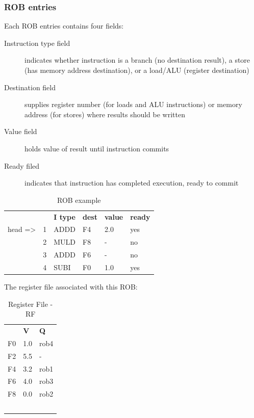 \subsubsection{ROB entries}
Each ROB entries contains four fields:
\begin{description}
    \item[Instruction type field] indicates whether instruction
    is a branch (no destination result), a store (has
    memory address destination), or a load/ALU
    (register destination)
    \item[Destination field] supplies register number (for
    loads and ALU instructions) or memory address (for
    stores) where results should be written
    \item[Value field] holds value of result until
    instruction commits
    \item[Ready filed] indicates that instruction has
    completed execution, ready to commit
\end{description}

\begin{table}[H]
    \centering
    \begin{tabular}{llllll}
        & & \textbf{I type} & \textbf{dest} & \textbf{value} & \textbf{ready}  \\
        head => & 1 & ADDD & F4 & 2.0 & yes \\
        & 2 & MULD & F8 & - & no \\
        & 3 & ADDD & F6 & - & no \\
        & 4 & SUBI & F0 & 1.0 & yes \\
    \end{tabular}
    \caption{ROB example}
    \label{tab:rob-example}
\end{table}

The register file associated with this ROB:
\begin{table}[H]
    \centering
    \begin{tabular}{l|ll}
        \textbf{} & \textbf{V} & \textbf{Q} \\
        F0 & 1.0 & rob4 \\
        F2 & 5.5 & - \\
        F4 & 3.2 & rob1 \\
        F6 & 4.0 & rob3 \\
        F8 & 0.0 & rob2 \\
        \
    \end{tabular}
    \caption{Register File - RF}
    \label{tab:register-file-with-rob}
\end{table}

